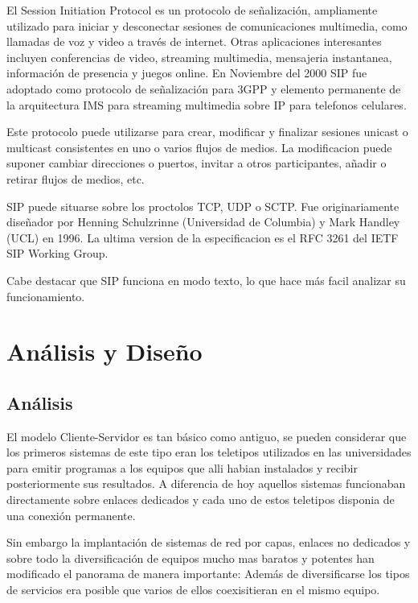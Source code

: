 \documentclass[a4paper,spanish,12pt]{book}
\begin{document}
El Session Initiation Protocol es un protocolo de señalización, ampliamente utilizado para iniciar y desconectar sesiones de comunicaciones multimedia, como llamadas de voz y video a trav\'es de internet. Otras aplicaciones interesantes incluyen conferencias de video, streaming multimedia, mensajeria instantanea, información de presencia y juegos online. En Noviembre del 2000 SIP fue adoptado como protocolo de señalización para 3GPP y elemento permanente de la arquitectura IMS para streaming multimedia sobre IP para telefonos celulares.

Este protocolo puede utilizarse para crear, modificar y finalizar sesiones unicast o multicast consistentes en uno o varios flujos de medios. La modificacion puede suponer cambiar direcciones o puertos, invitar a otros participantes, añadir o retirar flujos de medios, etc.

SIP puede situarse sobre los proctolos TCP, UDP o SCTP. Fue originariamente diseñador por Henning Schulzrinne (Universidad de Columbia) y Mark Handley (UCL) en 1996. La ultima version de la especificacion es el RFC 3261 del IETF SIP Working Group.

Cabe destacar que SIP funciona en modo texto, lo que hace más facil analizar su funcionamiento.

\chapter{Análisis y Diseño}
\section{Análisis}
El modelo Cliente-Servidor es tan básico como antiguo, se pueden considerar que los primeros sistemas de este tipo eran los teletipos utilizados en las universidades para emitir programas a los equipos que alli habian instalados y recibir posteriormente sus resultados. A diferencia de hoy aquellos sistemas funcionaban directamente sobre enlaces dedicados y cada uno de estos teletipos disponia de una conexión permanente.

Sin embargo la implantación de sistemas de red por capas, enlaces no dedicados y sobre todo la diversificación de equipos mucho mas baratos y potentes han modificado el panorama de manera importante: Además de diversificarse los tipos de servicios era posible que varios de ellos coexisitieran en el mismo equipo.
\end{document}

